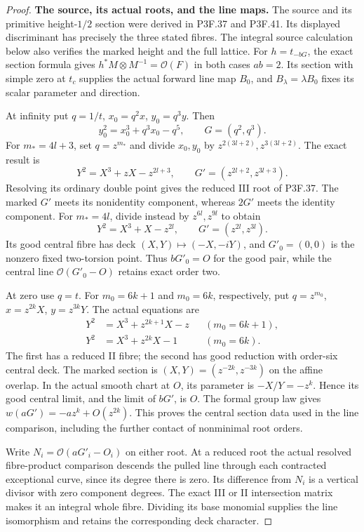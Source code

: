 \begin{proof}
\par\medskip\noindent\textbf{The source, its actual roots, and the line maps.}\enspace
The source and its primitive height-$1/2$ section were derived
in P3F.37 and P3F.41. Its displayed discriminant has precisely
the three stated fibres. The integral source calculation below
also verifies the marked height and the full lattice.
For $h=t_{-bG}$, the exact section formula gives
$h^*M\otimes M^{-1}=\mathcal O(F)$ in both cases $ab=2$.
Its section with simple zero at $t_c$ supplies the actual forward
line map $B_0$, and $B_\lambda=\lambda B_0$ fixes its scalar
parameter and direction.

At infinity put $q=1/t$, $x_0=q^2x$, $y_0=q^3y$.
Then
\[
 y_0^2=x_0^3+q^3x_0-q^5,\qquad G=(q^2,q^3).
\]
For $m_*=4l+3$, set $q=z^{m_*}$ and divide $x_0,y_0$
by $z^{2(3l+2)},z^{3(3l+2)}$. The exact result is
\[
 Y^2=X^3+zX-z^{2l+3},\qquad
 G'=(z^{2l+2},z^{3l+3}).                            \tag{F47.3}
\]
Resolving its ordinary double point gives the reduced III
root of P3F.37. The marked $G'$ meets its nonidentity component,
whereas $2G'$ meets the identity component. For $m_*=4l$,
divide instead by $z^{6l},z^{9l}$ to obtain
\[
 Y^2=X^3+X-z^{2l},\qquad G'=(z^{2l},z^{3l}).         \tag{F47.4}
\]
Its good central fibre has deck $(X,Y)\mapsto(-X,-iY)$,
and $G'_0=(0,0)$ is the nonzero fixed two-torsion point.
Thus $bG'_0=O$ for the good pair, while the central line
$\mathcal O(G'_0-O)$ retains exact order two.

At zero use $q=t$. For $m_0=6k+1$ and $m_0=6k$, respectively,
put $q=z^{m_0}$, $x=z^{2k}X$, $y=z^{3k}Y$.
The actual equations are
\[
 \begin{aligned}
 Y^2&=X^3+z^{2k+1}X-z &&(m_0=6k+1),\\
 Y^2&=X^3+z^{2k}X-1   &&(m_0=6k).
 \end{aligned}                                         \tag{F47.5}
\]
The first has a reduced II fibre; the second has good reduction
with order-six central deck. The marked section is
$(X,Y)=(z^{-2k},z^{-3k})$ on the affine overlap. In the actual
smooth chart at $O$, its parameter is $-X/Y=-z^k$.
Hence its good central limit, and the limit of $bG'$, is $O$.
The formal group law gives $w(aG')=-az^k+O(z^{2k})$.
This proves the central section data used in the line comparison,
including the further contact of nonminimal root orders.

Write $N_i=\mathcal O(aG'_i-O_i)$ on either root. At a
reduced root the actual resolved fibre-product comparison
descends the pulled line through each contracted exceptional
curve, since its degree there is zero. Its difference from
$N_i$ is a vertical divisor with zero component degrees.
The exact III or II intersection matrix makes it an integral
whole fibre. Dividing its base monomial supplies the line
isomorphism and retains the corresponding deck character.


\end{proof}
